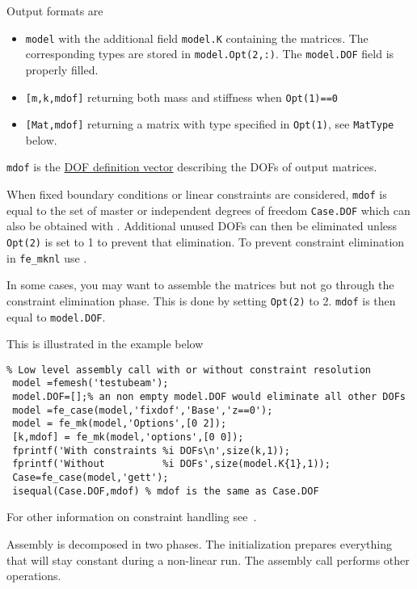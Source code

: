 Output formats are

\begin{itemize}

\item {\tt model} with the additional field {\tt model.K} containing the matrices. The corresponding types are stored in {\tt model.Opt(2,:)}. The {\tt model.DOF} field is properly filled.
\item {\tt [m,k,mdof]} returning both mass and stiffness when {\tt Opt(1)==0}
\item {\tt [Mat,mdof]} returning a matrix with type specified in {\tt Opt(1)}, see {\tt MatType} below.

\end{itemize}

{\tt mdof} is the \hyperlink{mdof}{DOF definition vector} describing the DOFs of output matrices. 

When fixed boundary conditions or linear constraints are considered, {\tt mdof} is equal to the set of master or independent degrees of freedom {\tt Case.DOF} which can also be obtained with . Additional unused DOFs can then be eliminated unless {\tt Opt(2)} is set to 1 to prevent that elimination. To prevent constraint elimination in {\tt fe\_mknl} use .

In some cases, you may want to assemble the matrices but not go through the constraint elimination phase. This is done by setting {\tt Opt(2)} to 2. {\tt mdof} is then equal to {\tt model.DOF}.

This is illustrated in the example below

\begin{verbatim}
% Low level assembly call with or without constraint resolution
 model =femesh('testubeam');
 model.DOF=[];% an non empty model.DOF would eliminate all other DOFs
 model =fe_case(model,'fixdof','Base','z==0');
 model = fe_mk(model,'Options',[0 2]); 
 [k,mdof] = fe_mk(model,'options',[0 0]); 
 fprintf('With constraints %i DOFs\n',size(k,1)); 
 fprintf('Without          %i DOFs',size(model.K{1},1));
 Case=fe_case(model,'gett');
 isequal(Case.DOF,mdof) % mdof is the same as Case.DOF
\end{verbatim}%


For other information on constraint handling see~.


Assembly is decomposed in two phases. The initialization prepares everything that will stay constant during a non-linear run. The assembly call performs other operations.

